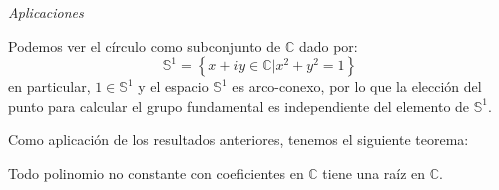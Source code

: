 \documentclass{article}
\newcounter{it}
\theoremstyle{largebreak}
\newcommand\subtitle[1]{\textit{\large #1}\\}
\begin{document}
    \subtitle{Aplicaciones}

    \begin{obs}
        Podemos ver el círculo como subconjunto de $\mathbb{C}$ dado por:
        \begin{equation*}
            \mathbb{S}^1=\left\{x+iy\in\mathbb{C}\Big|x^2+y^2=1 \right\}
        \end{equation*}
        en particular, $1\in\mathbb{S}^1$ y el espacio $\mathbb{S}^1$ es arco-conexo, por lo que la elección del punto para calcular el grupo fundamental es independiente del elemento de $\mathbb{S}^1$.
    \end{obs}

    Como aplicación de los resultados anteriores, tenemos el siguiente teorema:

    \begin{theor}
        Todo polinomio no constante con coeficientes en $\mathbb{C}$ tiene una raíz en $\mathbb{C}$.
    \end{theor}
\end{document}
